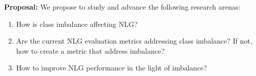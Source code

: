 \textbf{Proposal:} We propose to study and advance the following research arenas:
\begin{enumerate}
 \item How is class imbalance affecting NLG?
 \item Are the current NLG evaluation metrics addressing class imbalance? If not, how to create a metric that address imbalance?
 \item How to improve NLG performance in the light of imbalance?
\end{enumerate}

